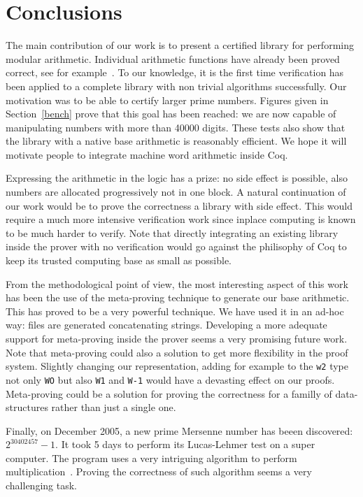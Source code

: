 \section{Conclusions}

The main contribution of our work is to present a certified library for performing
modular arithmetic. Individual arithmetic functions have already been proved correct,
see for example~\cite{BerMagZim02}. To our knowledge, it is the first time verification
has been applied to a complete library  with non trivial algorithms successfully.
Our motivation was to be able to certify  larger prime numbers. Figures given in Section~\ref{bench} 
prove that this goal has been reached: we are now capable of manipulating numbers with more than 40000 digits.
These tests also show that the library with a native base arithmetic is
reasonably efficient. We hope it will motivate people to integrate machine word arithmetic inside {\sc Coq}.

Expressing the arithmetic in the logic has a prize: no side effect is possible, 
also numbers are allocated progressively not in one block.
A natural continuation of our work would be to prove the correctness a library with side effect.
This would require a much more intensive verification work since inplace computing
is known to be much harder to verify.
Note that directly integrating an existing library inside the prover with no verification
would go against the philisophy of {\sc Coq} to keep its trusted computing base as small
as possible.

From the methodological point of view, the most interesting aspect of this work
has been the use of the meta-proving technique to generate our base arithmetic. This has proved
to be a very powerful technique. We have used it in an ad-hoc way: files are generated concatenating
strings. Developing a more adequate support for meta-proving inside the prover seems a
very promising future work. Note that meta-proving could also a solution to get more flexibility
in the proof system. Slightly changing our representation, adding for example to  the {\tt w2} type not only {\tt WO}
but also {\tt W1} and {\tt W-1} would have a devasting effect on our proofs.
Meta-proving could be a solution for proving the correctness for a familly of data-structures rather than
just a single one.

Finally, on December 2005, a new prime Mersenne number has beeen discovered: $2 ^{30402457} - 1$.
It took 5 days to  perform its Lucas-Lehmer test on a super computer. The program
uses a very intriguing algorithm to perform multiplication~\cite{crandall}. Proving the correctness of
such algorithm seems a very challenging task. 